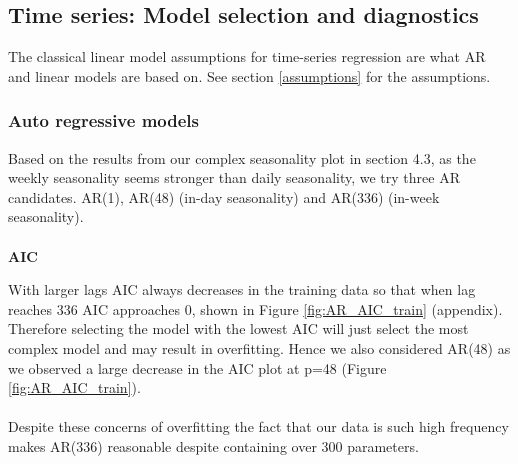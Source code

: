 \documentclass[11pt]{article}
\begin{document}
\subsection{Time series: Model selection and diagnostics}
The classical linear model assumptions for time-series regression are what AR and linear models are based on. See section \ref{assumptions} for the assumptions.






\subsubsection{Auto regressive models}

Based on the results from our complex seasonality plot in section 4.3, as the weekly seasonality seems stronger than daily seasonality, we try three AR candidates. AR(1), AR(48) (in-day seasonality) and AR(336) (in-week seasonality).
\\
\\
\textbf{AIC}


\noindent With larger lags AIC always decreases in the training data so that when lag reaches 336 AIC approaches 0, shown in Figure \ref{fig:AR_AIC_train} (appendix). Therefore selecting the model with the lowest AIC will just select the most complex model and may result in overfitting. Hence we also considered AR(48) as we observed a large decrease in the AIC plot at p=48 (Figure \ref{fig:AR_AIC_train}). 
\\
\\
Despite these concerns of overfitting the fact that our data is such high frequency makes AR(336) reasonable despite containing over 300 parameters.
\end{document}
